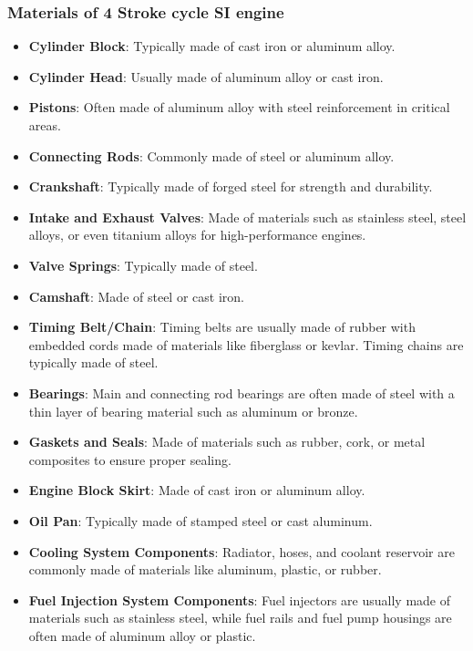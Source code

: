 \documentclass{article}
\begin{document}
\subsubsection*{Materials of 4 Stroke cycle SI engine}
\begin{itemize}
	\item \textbf{Cylinder Block}: Typically made of cast iron or aluminum alloy.

	\item \textbf{Cylinder Head}: Usually made of aluminum alloy or cast iron.

	\item \textbf{Pistons}: Often made of aluminum alloy with steel reinforcement in critical areas.

	\item \textbf{Connecting Rods}: Commonly made of steel or aluminum alloy.

	\item \textbf{Crankshaft}: Typically made of forged steel for strength and durability.

	\item \textbf{Intake and Exhaust Valves}: Made of materials such as stainless steel, steel alloys, or even titanium alloys for high-performance engines.

	\item \textbf{Valve Springs}: Typically made of steel.

	\item \textbf{Camshaft}: Made of steel or cast iron.

	\item \textbf{Timing Belt/Chain}: Timing belts are usually made of rubber with embedded cords made of materials like fiberglass or kevlar. Timing chains are typically made of steel.

	\item \textbf{Bearings}: Main and connecting rod bearings are often made of steel with a thin layer of bearing material such as aluminum or bronze.

	\item \textbf{Gaskets and Seals}: Made of materials such as rubber, cork, or metal composites to ensure proper sealing.

	\item \textbf{Engine Block Skirt}: Made of cast iron or aluminum alloy.

	\item \textbf{Oil Pan}: Typically made of stamped steel or cast aluminum.

	\item \textbf{Cooling System Components}: Radiator, hoses, and coolant reservoir are commonly made of materials like aluminum, plastic, or rubber.

	\item \textbf{Fuel Injection System Components}: Fuel injectors are usually made of materials such as stainless steel, while fuel rails and fuel pump housings are often made of aluminum alloy or plastic.
\end{itemize}
\vspace{1cm}
\end{document}
